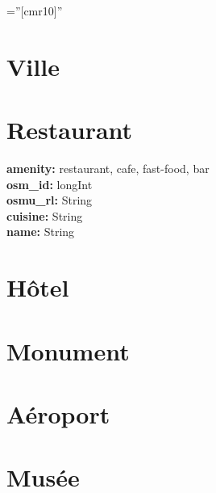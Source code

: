 \documentclass[a4paper,10pt]{article} %
\begin{document}
\font\fb=''[cmr10]'' %

\par{\bigskip \bigskip \par}

\section{ Ville} 

\bigskip
\section{ Restaurant}
\textbf{ amenity:} restaurant, cafe, fast-food, bar\\
\textbf{osm\_id:} longInt \\
\textbf{osmu\_rl:} String \\
\textbf{cuisine:} String \\
\textbf{name:} String

\bigskip
\section{ Hôtel}

\bigskip
\section{ Monument}

\bigskip
\section{ Aéroport}

\bigskip
\section{ Musée}

\bigskip

\end{document}
